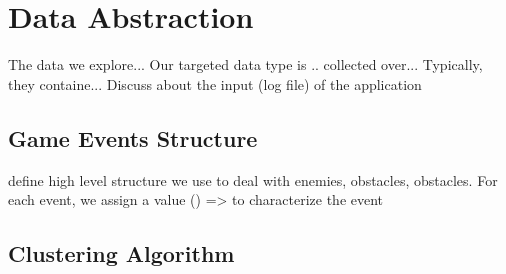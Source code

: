 \chapter{Data Abstraction}
The data we explore...
Our targeted data type is .. collected over... Typically, they containe...
Discuss about the input (log file) of the application
\section{Game Events Structure}
define high level structure we use to deal with enemies, obstacles, obstacles. For each event, we assign a value () => to characterize the event
\section{Clustering Algorithm}